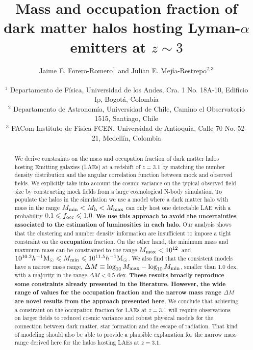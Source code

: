 \documentclass[usenatbib]{mn2e}
\newcommand{\ly}{{\ifmmode{{\rm Ly}\alpha}\else{Ly$\alpha$~}\fi}}
\newcommand{\hMsun}{{\ifmmode{h^{-1}{\rm
        {M_{\odot}}}}\else{$h^{-1}{\rm{M_{\odot}}}$}\fi}}
\begin{document}
\title[Halo mass and occupation fraction of LAEs at$z=3.1$]{Mass and
  occupation fraction of dark matter halos hosting Lyman-$\alpha$
  emitters at $z\sim 3$}      
\author[~J.~E. Forero-Romero and ~J.~E. Mejia-Restrepo]{
\parbox[t]{\textwidth}{\raggedright 
  Jaime E. Forero-Romero$^{1}$ and
  Julian E. Mej\'ia-Restrepo$^{2,3}$ 
}
\vspace*{6pt}\\
$^{1}$ Departamento de F\'{i}sica, Universidad de los Andes, Cra. 1
No. 18A-10, Edificio Ip, Bogot\'a, Colombia \\
$^{2}$ Departamento de Astronom\'{i}a, Universidad de Chile, Camino el
Observatorio 1515, Santiago, Chile\\
$^3$ FACom-Instituto de F\'isica-FCEN, Universidad de Antioquia, Calle 70 No. 52-21, Medell\'in, Colombia} 

\maketitle

\begin{abstract}
%
We derive constraints on the mass and occupation fraction of dark
matter halos hosting \ly Emitting galaxies (LAEs) at a redshift of
$z=3.1$ by matching the number density distribution and the angular
correlation function between mock and observed fields. We explicitly
take into account the cosmic variance on the typical observed field
size by constructing mock fields from a large cosmological N-body
simulation. To populate the
halos in the simulation we use a model where a dark matter halo with
mass in the range $M_{\rm min}<M_{\rm h}<M_{\rm max}$ can only host
one detectable LAE with a probability $0.1 \leq f_{\rm occ}\leq
1.0$. {\bf We use this approach to avoid the uncertainties associated
  to the estimation of \ly luminosities in each halo.} Our analysis
shows that the clustering and number density information are
insufficient to impose a tight constraint on the {\bf   occupation}
fraction. On the other hand, the minimum mass and maximum mass can be
constrained to the range $M_{\rm  max}<10^{12}$\hMsun\ and
$10^{10.2}\hMsun\leq M_{\rm min}\leq 10^{11.5}\hMsun$. We also find
that the consistent models have a narrow mass range, $\Delta M \equiv
\log_{10}M_{\rm max} - \log_{10} M_{\rm min}$, smaller than $1.0$ dex,
with a majority in the range $\Delta M<0.5$ dex. {\bf These results
  broadly reproduce some constraints   already presented in the
  literature. However, the wide range of values for the occupation
  fraction and the narrow mass range $\Delta M$ are novel results from
  the approach presented here}. We conclude that achieving a constraint on the
occupation fraction for LAEs at $z=3.1$ will require observations on
larger fields to reduced cosmic variance and robust physical models
for the connection between dark matter, star formation and the escape
of \ly radiation. That kind of modeling should also be able to provide
a plausible explanation for the narrow mass range derived here for the
halos hosting LAEs at $z=3.1$. 
\end{abstract}
\end{document}
